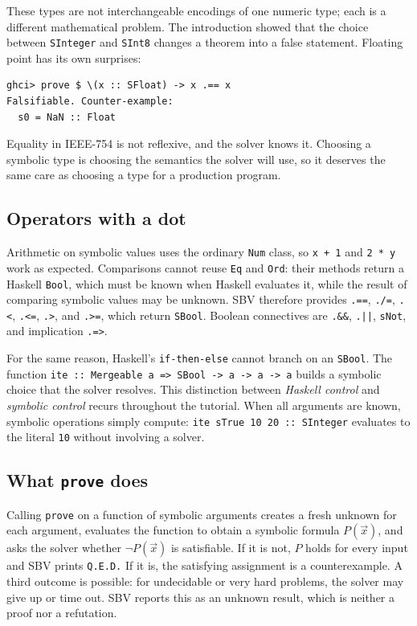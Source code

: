 \documentclass[acmsmall,screen,review,anonymous,nonacm]{acmart}
\newcommand{\code}[1]{\texttt{#1}}
\begin{document}
These types are not interchangeable encodings of one numeric type; each is a
different mathematical problem. The introduction showed that the choice between
\code{SInteger} and \code{SInt8} changes a theorem into a false statement.
Floating point has its own surprises:
\begin{lstlisting}
ghci> prove $ \(x :: SFloat) -> x .== x
Falsifiable. Counter-example:
  s0 = NaN :: Float
\end{lstlisting}
Equality in IEEE-754 is not reflexive, and the solver knows it. Choosing a
symbolic type is choosing the semantics the solver will use, so it deserves the
same care as choosing a type for a production program.

\subsection{Operators with a dot}

Arithmetic on symbolic values uses the ordinary \code{Num} class, so \code{x + 1}
and \code{2 * y} work as expected. Comparisons cannot reuse \code{Eq} and
\code{Ord}: their methods return a Haskell \code{Bool}, which must be known when
Haskell evaluates it, while the result of comparing symbolic values may be
unknown. SBV therefore provides \code{.==}, \code{./=}, \code{.<}, \code{.<=},
\code{.>}, and \code{.>=}, which return \code{SBool}. Boolean connectives are
\code{.\&\&}, \code{.||}, \code{sNot}, and implication \code{.=>}.

For the same reason, Haskell's \code{if-then-else} cannot branch on an
\code{SBool}. The function \code{ite :: Mergeable a => SBool -> a -> a -> a}
builds a symbolic choice that the solver resolves. This distinction between
\emph{Haskell control} and \emph{symbolic control} recurs throughout the
tutorial. When all arguments are known, symbolic operations simply compute:
\code{ite sTrue 10 20 :: SInteger} evaluates to the literal \code{10} without involving a
solver.

\subsection{What \texttt{prove} does}

Calling \code{prove} on a function of symbolic arguments creates a fresh
unknown for each argument, evaluates the function to obtain a symbolic formula
$P(\vec{x})$, and asks the solver whether $\neg P(\vec{x})$ is satisfiable. If it
is not, $P$ holds for every input and SBV prints \code{Q.E.D.} If it is, the
satisfying assignment is a counterexample. A third outcome is possible: for
undecidable or very hard problems, the solver may give up or time out. SBV reports
this as an unknown result, which is neither a proof nor a refutation.
\end{document}
